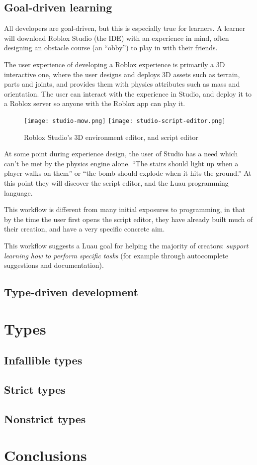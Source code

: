 \documentclass[acmsmall]{acmart}
\begin{document}
\subsection{Goal-driven learning}

All developers are goal-driven, but this is especially true for
learners. A learner will download Roblox Studio (the IDE) with an
experience in mind, often designing an obstacle course (an ``obby'')
to play in with their friends.

The user experience of developing a Roblox experience is
primarily a 3D interactive one, where the user designs and deploys 3D
assets such as terrain, parts and joints, and provides them with
physics attributes such as mass and orientation. The user can interact
with the experience in Studio, and deploy it to a Roblox server so anyone with
the Roblox app can play it.

\begin{figure}
\texttt{[image: studio-mow.png]}
\texttt{[image: studio-script-editor.png]}
\caption{Roblox Studio's 3D environment editor, and script editor}
\end{figure}

At some point during experience design, the user of Studio has a need
which can't be met by the physics engine alone. ``The stairs should
light up when a player walks on them'' or ``the bomb should explode
when it hits the ground.'' At this point they will discover the script
editor, and the Luau programming language.

This workflow is different from many initial exposures to programming,
in that by the time the user first opens the script editor, they have
already built much of their creation, and have a very specific
concrete aim.

This workflow suggests a Luau goal for helping the majority of
creators: \emph{support learning how to perform specific tasks} (for
example through autocomplete suggestions and documentation).

\subsection{Type-driven development}

\section{Types}
\subsection{Infallible types}
\subsection{Strict types}
\subsection{Nonstrict types}

\section{Conclusions}

 
\end{document}
